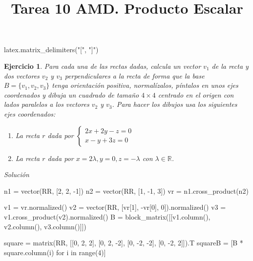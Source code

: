 \documentclass{amsart}
\title{Tarea 10 AMD. Producto Escalar}
\newtheorem{ejer}{Ejercicio}
\begin{document}
\maketitle

\begin{sagecode}
latex.matrix_delimiters("[", "]")
\end{sagecode}

\begin{ejer}
Para cada una de las rectas dadas, calcula un vector $v_1$ de la recta y dos vectores 
$v_2$ y $v_3$ perpendiculares a la recta de forma que la base $B = \{v_1,v_2,v_3\}$ tenga 
orientación positiva, normalízalos, píntalos en unos ejes coordenados y dibuja un cuadrado de 
tamaño $4\times 4$ centrado en el origen con lados paralelos a los vectores $v_2$ y $v_3$.
Para hacer los dibujos usa los siguientes ejes coordenados:

\begin{sagesub}
\begin{center}
\end{center}
\end{sagesub}


\begin{enumerate}
\item La recta $r$ dada por $\begin{cases} 2x+2y-z = 0 \\ x-y+3z = 0 \end{cases} $
\item La recta $r$ dada por $x = 2\lambda, y = 0, z = -\lambda$ con $\lambda \in {\mathbb R}$.
\end{enumerate}
\end{ejer}

{\it Solución}


\begin{sageblock}
n1 = vector(RR, [2, 2, -1])
n2 = vector(RR, [1, -1, 3])
vr = n1.cross_product(n2)

v1 = vr.normalized()
v2 = vector(RR, [vr[1], -vr[0], 0]).normalized()
v3 = v1.cross_product(v2).normalized()
B = block_matrix([[v1.column(), v2.column(), v3.column()]])

square = matrix(RR, [[0, 2, 2], [0, 2, -2], [0, -2, -2], [0, -2, 2]]).T
squareB = [B * square.column(i) for i in range(4)]
\end{sageblock}
\end{document}
